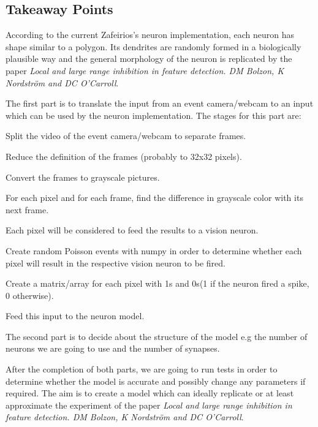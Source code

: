 \documentclass{article}
\begin{document}
{\addtolength{\leftskip}{3mm}
\subsection*{Takeaway Points}
}
\begin{compactenum}
\item According to the current Zafeirios's neuron implementation, each neuron has shape similar to a polygon. Its dendrites are randomly formed in a biologically plausible way and the general morphology of the neuron is replicated by the paper \textit{Local and large ­range inhibition in feature detection. DM Bolzon, K Nordström and DC O'Carroll}.
\item The first part is to translate the input from an event camera/webcam to an input which can be used by the neuron implementation. The stages for this part are:
	\begin{compactenum}
	\item Split the video of the event camera/webcam to separate frames.
	\item Reduce the definition of the frames (probably to 32x32 pixels).
	\item Convert the frames to grayscale pictures.
	\item For each pixel and for each frame, find the difference in grayscale color with its next frame.
	\item Each pixel will be considered to feed the results to a vision neuron.
	\item Create random Poisson events with numpy in order to determine whether each pixel will result in the respective vision neuron to be fired.
	\item Create a matrix/array for each pixel with 1s and 0s(1 if the neuron fired a spike, 0 otherwise).
	\item Feed this input to the neuron model.
	\end{compactenum}
\item The second part is to decide about the structure of the model e.g the number of neurons we are going to use and  the number of synapses.

\item After the completion of both parts, we are going to run tests in order to determine whether the model is accurate and possibly change any parameters if required. The aim is to create a model which can ideally replicate or at least approximate the experiment of the paper \textit{Local and large ­range inhibition in feature detection. DM Bolzon, K Nordström and DC O'Carroll}.
\end{compactenum}
\end{document}
